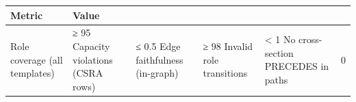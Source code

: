 \begin{tabular}{ll}
\toprule
Metric & Value \\
\midrule
Role coverage (all templates) & ≥ 95%
Capacity violations (CSRA rows) & ≤ 0.5%
Edge faithfulness (in-graph) & ≥ 98%
Invalid role transitions & < 1%
No cross-section PRECEDES in paths & 0 \\
\bottomrule
\end{tabular}
